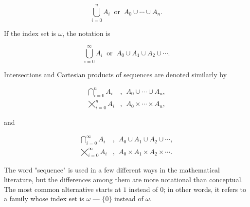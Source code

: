 \begin{equation*}
\bigcup_{i = 0}^{n} A_{i} \: \text{ or } \: A_{0}\cup \cdots \cup A_{n}.
\end{equation*}

If the index set is $ \omega $, the notation is 

\begin{equation*}
\bigcup_{i = 0}^{\infty} A_{i} \: \text{ or } \: A_{0} \cup A_{1} \cup A_{2} \cup \cdots .
\end{equation*}

Intersections and Cartesian products of sequences are denoted similarly by

\begin{align*}
\bigcap_{i = 0}^{n} A_{i} &, \: \: A_{0}\cup \cdots \cup A_{n}, \\
\bigtimes_{i = 0}^{n} A_{i} &, \: \: A_{0}\times \cdots \times A_{n},
\end{align*}

and

\begin{align*}
\bigcap_{i = 0}^{\infty} A_{i} &, \: \: A_{0} \cup A_{1} \cup A_{2} \cup \cdots , \\
\bigtimes_{i = 0}^{\infty} A_{i} &, \:  \: A_{0} \times A_{1} \times A_{2} \times \cdots .
\end{align*}

The word "sequence" is used in a few different ways in the mathematical literature, but the differences among them are more notational than conceptual. The most common alternative starts at $1$ instead of $0$; in other words, it refers to a family whose index set is $ \omega $ — $\{ 0 \}$ instead of $ \omega $.